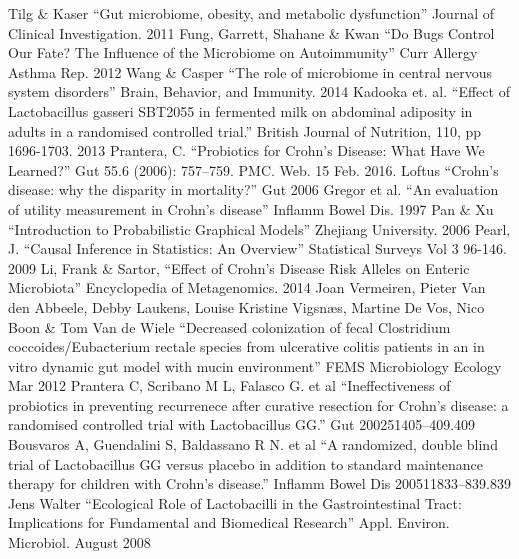 \documentclass[a4paper]{article}
\begin{document}
\begin{thebibliography}{11}
 Tilg \& Kaser ``Gut microbiome, obesity, and metabolic
  dysfunction'' Journal of Clinical Investigation. 2011
 Fung, Garrett, Shahane \& Kwan ``Do Bugs Control Our
  Fate? The Influence of the Microbiome on Autoimmunity'' Curr Allergy
  Asthma Rep. 2012
 Wang \& Casper ``The role of microbiome in central
  nervous system disorders'' Brain, Behavior, and Immunity. 2014
 Kadooka et. al. ``Effect of Lactobacillus gasseri SBT2055
  in fermented milk on abdominal adiposity in adults in a randomised
  controlled trial.'' British Journal of Nutrition, 110, pp
  1696-1703. 2013
 Prantera, C. ``Probiotics for Crohn’s Disease: What
  Have We Learned?'' Gut 55.6 (2006): 757–759. PMC. Web. 15 Feb. 2016.
 Loftus ``Crohn’s disease: why the disparity in
  mortality?'' Gut 2006
  Gregor et al. ``An evaluation of utility measurement in Crohn's disease'' Inflamm Bowel Dis. 1997
 Pan \& Xu ``Introduction to Probabilistic
  Graphical Models'' Zhejiang University. 2006
 Pearl, J. ``Causal Inference in Statistics: An
  Overview'' Statistical Surveys Vol 3 96-146. 2009
 Li, Frank \& Sartor, ``Effect of Crohn’s Disease Risk
  Alleles on Enteric Microbiota'' Encyclopedia of Metagenomics. 2014
 Joan Vermeiren, Pieter Van den Abbeele, Debby Laukens,
  Louise Kristine Vigsnæs, Martine De Vos, Nico Boon \& Tom Van de
  Wiele ``Decreased colonization of fecal Clostridium
  coccoides/Eubacterium rectale species from ulcerative colitis
  patients in an in vitro dynamic gut model with mucin environment'' FEMS Microbiology Ecology Mar 2012
 Prantera C, Scribano M L, Falasco G. et al ``Ineffectiveness of probiotics in preventing recurrenece after curative resection for Crohn's disease: a randomised controlled trial with Lactobacillus GG.'' Gut 200251405–409.409
 Bousvaros A, Guendalini S, Baldassano R N. et al ``A randomized, double blind trial of Lactobacillus GG versus placebo in addition to standard maintenance therapy for children with Crohn's disease.'' Inflamm Bowel Dis 200511833–839.839
 Jens Walter ``Ecological Role of Lactobacilli in the
  Gastrointestinal Tract: Implications for Fundamental and Biomedical
  Research'' Appl. Environ. Microbiol. August 2008

    

\end{thebibliography}
\end{document}
